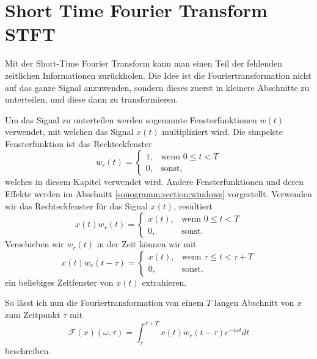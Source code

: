 %
%
%
%
\section{Short Time Fourier Transform STFT\label{sonogramm:section:teil0}}
Mit der Short-Time Fourier Transform kann man einen Teil der fehlenden zeitlichen Informationen zurückholen.
Die Idee ist die Fouriertransformation nicht auf das ganze Signal anzuwenden, sondern dieses zuerst in kleinere
Abschnitte zu unterteilen, und diese dann zu transformieren.

Um das Signal zu unterteilen werden sogenannte Fensterfunktionen $w(t)$ verwendet, mit welchen das Signal
$x(t)$ multipliziert wird.
Die simpelste Fensterfunktion ist das Rechteckfenster
\begin{equation}
    w_r(t) = 
        \begin{cases}
        1,& \text{wenn } 0 \le t < T\\
        0, & \text{sonst, }
        \end{cases}
\end{equation}
welches in diesem Kapitel verwendet wird.
Andere Fensterfunktionen und deren Effekte werden im Abschnitt \ref{sonogramm:section:windows} vorgestellt.
Verwenden wir das Rechteckfenster für das Signal $x(t)$, resultiert 
\begin{equation}
    x(t) w_r(t) = 
    \begin{cases}
    x(t),& \text{wenn } 0 \le t < T\\
    0, & \text{sonst.}
    \end{cases}
\end{equation}
Verschieben wir $w_r(t)$ in der Zeit können wir mit 
\begin{equation}
    x(t) w_r(t-\tau) = 
    \begin{cases}
        x(t),& \text{wenn } \tau \le t < \tau + T\\
        0, & \text{sonst.}
    \end{cases}
\end{equation}
ein beliebiges Zeitfenster von $x(t)$ extrahieren.

So lässt ich nun die Fouriertransformation von einem $T$ langen Abschnitt
von $x$ zum Zeitpunkt $\tau$ mit
\begin{equation}
    \mathscr{F}(x)(\omega, \tau) = \int_{\tau}^{\tau+T} x(t) w_r(t - \tau) e^{-i \omega t} dt
\end{equation}
beschreiben.

